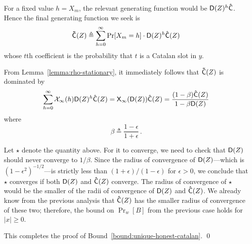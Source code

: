   For a fixed value $h = X_m$, the relevant generating function 
  would be $\mathsf{D}(Z)^{h}\mathsf{\hat{C}}$. 
  Hence the final generating function we seek is
  $$
    \mathsf{\tilde{C}}(Z) \triangleq \sum_{h = 0}^\infty \Pr[X_m = h] \cdot \mathsf{D}(Z)^h  \mathsf{\hat{C}}(Z)
  $$
  whose $t$th coefficient is the probability that 
  $t$ is a Catalan slot in $y$.

  From Lemma~\ref{lemma:rho-stationary}, it immediately follows that $\mathsf{\tilde{C}}(Z)$ is dominated by 
  $$
      \sum_{h = 0}^\infty \mathcal{X}_\infty(h) \mathsf{D}(Z)^h \mathsf{\hat{C}}(Z)
    = \mathsf{X}_\infty(\mathsf{D}(Z)) \mathsf{\hat{C}}(Z)
    = \frac{(1 - \beta)\mathsf{\hat{C}}(Z)}{1 - \beta \mathsf{D}(Z)}
  $$
  where $$\beta \triangleq \frac{1-\epsilon}{1+\epsilon}\,.$$

  Let $\star$ denote the quantity above. 
  For it to converge, 
  we need to check that $\mathsf{D}(Z)$
  should never converge to $1/\beta$.  
  Since the radius of convergence of $\mathsf{D}(Z)$---which is
  $(1-\epsilon^2)^{-1/2}$---is strictly less than 
  $(1+\epsilon)/(1-\epsilon)$ for $\epsilon > 0$, 
  we conclude that $\star$ converges if
  both $\mathsf{D}(Z)$ and $\mathsf{\hat{C}}(Z)$ converge.  The radius of
  convergence of $\star$ would be the smaller of the radii
  of convergence of $\mathsf{D}(Z)$ and $\mathsf{\hat{C}}(Z)$.  We already
  know from the previous analysis that $\mathsf{\hat{C}}(Z)$ has the
  smaller radius of convergence of these two; 
  therefore, the bound
  on $\Pr_w[B]$ from the previous case holds for $|x| \geq 0$. 

  This completes the proof of Bound~\ref{bound:unique-honest-catalan}.
  \hfill\qed




  




